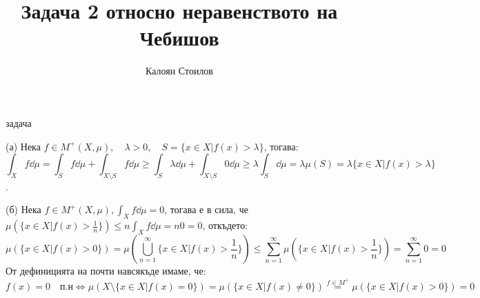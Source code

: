 \documentclass[bulgarian, 12pt]{article}
\title{\textbf{Задача 2} относно неравенството на Чебишов}
\author{Калоян Стоилов}
\begin{document}
\maketitle
\begin{labeling}{задача}
  \item [(а)] Нека $f \in M^+(X,\mu), \quad \lambda > 0, \quad S = \{x \in X | f(x) > \lambda\}$, тогава:
  \[
    \int_{X} f \dd \mu = \int_{S} f \dd \mu + \int_{X \setminus S} f \dd \mu \geq \int_{S} \lambda \dd \mu + \int_{X \setminus S} 0 \dd \mu \geq \lambda \int_{S} \dd \mu = \lambda \mu(S) = \lambda \{x \in X | f(x) > \lambda\}
  \].

  \item [(б)] Нека $f \in M^+(X,\mu), \int_{X} f \dd{\mu} = 0$, тогава е в сила, че $\mu(\{x \in X | f(x) > \frac{1}{n}\}) \leq n \int_{X} f \dd{\mu} = n 0 = 0$, откъдето:
  \[
    \mu(\{x \in X | f(x) > 0\}) = \mu(\bigcup_{n=1}^{\infty} \{x \in X | f(x) > \frac{1}{n}\}) \leq \sum_{n=1}^{\infty} \mu(\{x \in X | f(x) > \frac{1}{n}\}) = \sum_{n=1}^{\infty} 0 = 0
  \]
  От дефиницията на почти навсякъде имаме, че:
  \[
    f(x) = 0 \quad \text{п.н} \iff \mu(X \setminus \{x \in X | f(x) = 0\}) = \mu(\{x \in X | f(x) \neq 0\}) \overset{f \in M^+}{=} \mu(\{x \in X | f(x) > 0\}) = 0
  \]
\end{labeling}
\end{document}
